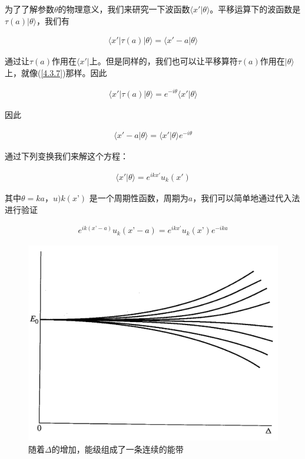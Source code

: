 \documentclass[UTF8,twoside]{ctexart}
\begin{document}
为了了解参数$\theta$的物理意义，我们来研究一下波函数$\langle x'|\theta\rangle$。平移运算下的波函数是$\tau(a)|\theta\rangle$，我们有

\begin{align}
\langle x'|\tau(a)|\theta\rangle = \langle x'-a|\theta\rangle
\end{align}

\noindent 通过让$\tau(a)$作用在$\langle x'|$上。但是同样的，我们也可以让平移算符$\tau(a)$作用在$|\theta\rangle$上，就像(\ref{4.3.7})那样。因此

\begin{align}
\langle x'|\tau(a)|\theta\rangle = e^{-i\theta}\langle x'|\theta\rangle
\end{align}

\noindent 因此

\begin{align}
\langle x'-a|\theta\rangle = \langle x'|\theta\rangle e^{-i\theta}
\end{align}

\noindent 通过下列变换我们来解这个方程：

\begin{align}\label{4.3.17}
\langle x'|\theta\rangle = e^{ikx'}u_k(x')
\end{align}

其中$\theta = ka$，$u)k(x’)$ 是一个周期性函数，周期为$a$，我们可以简单地通过代入法进行验证

\begin{align}\label{4.3.18}
e^{ik(x’-a)}u_k(x’-a) = e^{ikx’}u_k(x’)e^{-ika}
\end{align}

\begin{figure}[htbp]
\begin{centering}
\includegraphics[width = 12.4cm]{./Sakurai/Fig_4.8.png}
\caption{随着$\Delta$的增加，能级组成了一条连续的能带}
\label {Fig4.8}
\end{centering}
\end{figure}
\end{document}
